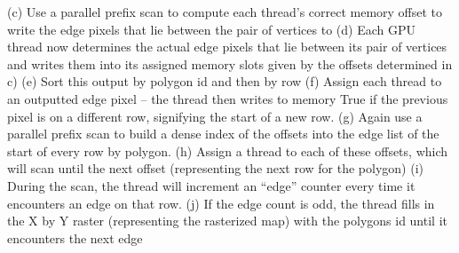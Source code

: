 \documentclass[twocolumn]{article}
\begin{document}
(c) Use a parallel prefix scan to compute each thread’s correct memory offset to write the edge pixels that lie between the pair of vertices to
(d) Each GPU thread now determines the actual edge pixels that lie between its pair of vertices and writes them into its assigned memory slots given by the offsets determined in c)
(e) Sort this output by polygon id and then by row
(f) Assign each thread to an outputted edge pixel – the thread then writes to
memory True if the previous pixel is on a different row, signifying the start of a
new row.
(g) Again use a parallel prefix scan to build a dense index of the offsets into the
edge list of the start of every row by polygon.
(h) Assign a thread to each of these offsets, which will scan until the next offset
(representing the next row for the polygon)
(i) During the scan, the thread will increment an “edge” counter every time it
encounters an edge on that row.
(j) If the edge count is odd, the thread fills in the X by Y raster (representing the
rasterized map) with the polygons id until it encounters the next edge

\end{document}
